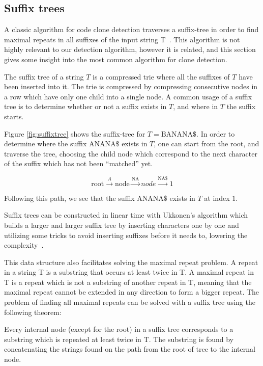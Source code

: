 \subsection*{Suffix trees}

A classic algorithm for code clone detection traverses a suffix-tree in order to find
maximal repeats in all suffixes of the input string T~\cite{Zibran_real_time_search,
GodeIncrementalCloneDetection}. This algorithm is not highly relevant to our detection
algorithm, however it is related, and this section gives some insight into the most common
algorithm for clone detection.

The suffix tree of a string $T$ is a compressed trie where all the suffixes of $T$ have
been inserted into it. The trie is compressed by compressing consecutive nodes in a row
which have only one child into a single node. A common usage of a suffix tree is to
determine whether or not a suffix exists in $T$, and where in $T$ the suffix starts.

Figure \ref{fig:suffixtree} shows the suffix-tree for $T=\text{BANANA\$}$. In order to
determine where the suffix $\text{ANANA\$}$ exists in $T$, one can start from the root,
and traverse the tree, choosing the child node which correspond to the next character of
the suffix which has not been ``matched'' yet.

$$
\text{root} \xrightarrow{A} \text{node} \xrightarrow{\text{NA}} node \xrightarrow{\text{NA\$}} 1
$$

Following this path, we see that the suffix $\text{ANANA\$}$ exists in $T$ at index $1$.

Suffix trees can be constructed in linear time with Ukkonen's algorithm which builds a
larger and larger suffix tree by inserting characters one by one and utilizing some tricks
to avoid inserting suffixes before it needs to, lowering the complexity~\cite{Ukkonen}.

This data structure also facilitates solving the maximal repeat problem. A repeat in a
string T is a substring that occurs at least twice in T. A maximal repeat in T is a repeat
which is not a substring of another repeat in T, meaning that the maximal repeat cannot be
extended in any direction to form a bigger repeat. The problem of finding all maximal
repeats can be solved with a suffix tree using the following theorem:

\begin{theorem}

    Every internal node (except for the root) in a suffix tree corresponds to a substring
    which is repeated at least twice in T. The substring is found by concatenating the
    strings found on the path from the root of tree to the internal node.

\end{theorem}


